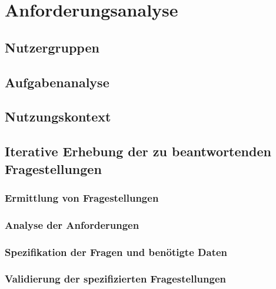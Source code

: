 \chapter{Anforderungsanalyse}
\label{anforderungsanalyse}
\minitoc\pagebreak
\lipsum[1-52]
\section{Nutzergruppen}

\section{Aufgabenanalyse}

\section{Nutzungskontext}

\section{Iterative Erhebung der zu beantwortenden Fragestellungen}
\subsection{Ermittlung von Fragestellungen}
\subsection{Analyse der Anforderungen}
\subsection{Spezifikation der Fragen und benötigte Daten}
\subsection{Validierung der spezifizierten Fragestellungen}